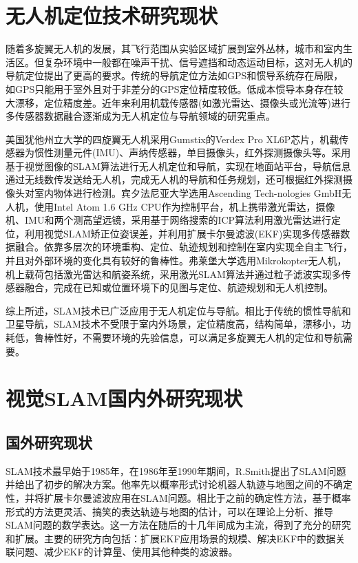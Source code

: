 \section{无人机定位技术研究现状}
随着多旋翼无人机的发展，其飞行范围从实验区域扩展到室外丛林，城市和室内生活区。但复杂环境中一般都在噪声干扰、信号遮挡和动态运动目标，这对无人机的导航定位提出了更高的要求。传统的导航定位方法如GPS和惯导系统存在局限，如GPS只能用于室外且对于非差分的GPS定位精度较低。低成本惯导本身存在较大漂移，定位精度差。近年来利用机载传感器(如激光雷达、摄像头或光流等)进行多传感器数据融合逐渐成为无人机定位与导航领域的研究重点。

美国犹他州立大学的四旋翼无人机采用Gumstix的Verdex Pro XL6P芯片，机载传感器为惯性测量元件(IMU)、声纳传感器，单目摄像头，红外探测摄像头等。采用基于视觉图像的SLAM算法进行无人机定位和导航，实现在地面站平台，导航信息通过无线数传发送给无人机，完成无人机的导航和任务规划，还可根据红外探测摄像头对室内物体进行检测。宾夕法尼亚大学选用Ascending Tech-nologies GmbH无人机，使用Intel Atom 1.6 GHz CPU作为控制平台，机上携带激光雷达，摄像机、IMU和两个测高望远镜，采用基于网络搜索的ICP算法利用激光雷达进行定位，利用视觉SLAM矫正位姿误差，并利用扩展卡尔曼滤波(EKF)实现多传感器数据融合。依靠多层次的环境重构、定位、轨迹规划和控制在室内实现全自主飞行，并且对外部环境的变化具有较好的鲁棒性。弗莱堡大学选用Mikrokopter无人机，机上载荷包括激光雷达和航姿系统，采用激光SLAM算法并通过粒子滤波实现多传感器融合，完成在已知或位置环境下的见图与定位、航迹规划和无人机控制。

综上所述，SLAM技术已广泛应用于无人机定位与导航。相比于传统的惯性导航和卫星导航，SLAM技术不受限于室内外场景，定位精度高，结构简单，漂移小，功耗低，鲁棒性好，不需要环境的先验信息，可以满足多旋翼无人机的定位和导航需要。

\section{视觉SLAM国内外研究现状}
\subsection{国外研究现状}
SLAM技术最早始于1985年\upcite{}，在1986年至1990年期间，R.Smith提出了SLAM问题并给出了初步的解决方案\upcite{}。他率先以概率形式讨论机器人轨迹与地图之间的不确定性，并将扩展卡尔曼滤波应用在SLAM问题。相比于之前的确定性方法，基于概率形式的方法更灵活、搞笑的表达轨迹与地图的估计，可以在理论上分析、推导SLAM问题的数学表达。这一方法在随后的十几年间成为主流，得到了充分的研究和扩展\upcite{}。主要的研究方向包括：扩展EKF应用场景的规模\upcite{}、解决EKF中的数据关联问题\upcite{}、减少EKF的计算量\upcite{}、使用其他种类的滤波器\upcite{}。

